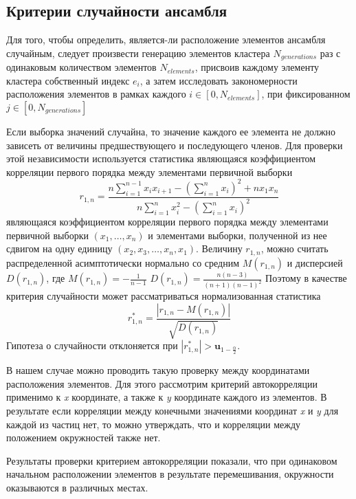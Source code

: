 \subsection{Критерии случайности ансамбля}

Для того, чтобы определить, является-ли расположение элементов ансамбля случайным, следует произвести генерацию элементов кластера $N_{generations}$ раз с одинаковым количеством элементов $N_{elements}$, присвоив каждому элементу кластера собственный индекс $e_{i}$, а затем исследовать закономерности расположения элементов в рамках каждого $i \in [0, N_{elements}]$, при фиксированном $j \in [0, N_{generations}]$ 

Если выборка значений случайна, то значение каждого ее элемента не должно зависеть от величины предшествующего и последующего членов. Для проверки этой независимости используется статистика являющаяся коэффициентом корреляции первого порядка
между элементами первичной выборки 
$$
r_{1, n}=\frac{n \sum_{i=1}^{n-1} x_{i} x_{i+1}-\left(\sum_{i=1}^{n} x_{i}\right)^{2}+n x_{1} x_{n}}{n \sum_{i=1}^{n} x_{i}^{2}-\left(\sum_{i=1}^{n} x_{i}\right)^{2}}
$$
являющаяся коэффициентом корреляции первого порядка
между элементами первичной выборки $ \left(x_{1}, \ldots, x_{n}\right) $ и элементами выборки, полученной из нее сдвигом на одну единицу $\left(x_{2}, x_{3}, \ldots, x_{n}, x_{1}\right)$. Величину $r_{1, n}$,
можно считать распределенной асимптотически нормально со средним $M\left(r_{1, n}\right)$ и дисперсией $D\left(r_{1, n}\right)$, где $M\left(r_{1, n}\right)=-\frac{1}{n-1}$ \newline
$D\left(r_{1, n}\right)=\frac{n(n-3)}{(n+1)(n-1)^{2}}$ Поэтому в качестве критерия случайности может рассматриваться нормализованная статистика 
$$
r_{1, n}^{*}=\frac{\left|r_{1, n}-M\left(r_{1, n}\right)\right|}{\sqrt{D\left(r_{1, n}\right)}}
$$ 
Гипотеза о случайности отклоняется при $\left|r_{1, n}^{*}\right|>\boldsymbol{u}_{1-\frac{\alpha}{2}}$.

В нашем случае можно проводить такую проверку между координатами расположения элементов. Для этого рассмотрим критерий автокорреляции применимо к \textit{x} координате, а также к \textit{y} координате каждого из элементов. В результате если корреляции между конечными значениями координат \textit{x} и \textit{y} для каждой из частиц нет, то можно утверждать, что и корреляции между положением окружностей также нет.

Результаты проверки критерием автокорреляции показали, что при одинаковом начальном расположении элементов в результате перемешивания, окружности оказываются в различных местах.

